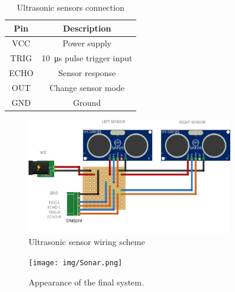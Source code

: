 
\begin{table}[p]
\centering
\begin{tabular}{c|c}
\hline
\textbf{Pin} & \textbf{Description}                         \\ \hline
VCC          & Power supply                                 \\
TRIG         & \SI{10}{\micro\second} pulse trigger input   \\
ECHO         & Sensor response                              \\
OUT          & Change sensor mode                           \\
GND          & Ground                  
\end{tabular}
\caption{Ultrasonic sensors connection}
\label{tab:wire_sensor}
\end{table}

\begin{figure}[p]
\centering
\includegraphics[width=0.8\textwidth, keepaspectratio]{img/wire-sensors.png}
\caption{Ultrasonic sensor wiring scheme}
\label{fig:wire_sensor}
\end{figure}

\begin{figure}[p]
\centering
\texttt{[image: img/Sonar.png]}
\caption{Appearance of the final system.}
\label{fig:sonar}
\end{figure}




